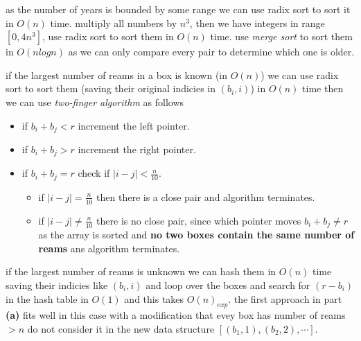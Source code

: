 \documentclass[12pt,twoside]{article}
\begin{document}
\begin{problems}
\begin{problemparts}
\problempart %
  as the number of years is bounded by some range we can use radix sort to sort it in $O(n)$ time.
\problempart %
  multiply all numbers by $n^3$, then we have integers in range $[0,4n^3]$, use radix sort 
  to sort them in $O(n)$ time.
\problempart %
  use \textit{merge sort} to sort them in $O(nlog{n})$ as we can only compare every pair to determine which
  one is older.
\end{problemparts}

\newpage

\problem  %

\begin{problemparts}
\problempart %
  if the largest number of reams in a box is known (in $O(n)$) we can use radix sort to sort them 
  (saving their original indicies in $(b_i, i)$) in $O(n)$ time then we can use \textit{two-finger algorithm} 
  as follows
  \begin{itemize}
      \item if $b_i + b_j < r$ increment the left pointer.
      \item if $b_i + b_j > r$ increment the right pointer.
      \item if $b_i + b_j = r$ check if $|i - j| < \frac{n}{10}$.
        \begin{itemize}
      \item if $|i - j| = \frac{n}{10}$ then there is a close pair and algorithm terminates.
      \item if $|i - j| \neq \frac{n}{10}$ there is no close pair, since which pointer moves 
       $b_i + b_j \neq r$ as the array is sorted and \textbf{no two boxes contain the same number of reams}
       ans algorithm terminates.
        \end{itemize}
  \end{itemize}
  if the largest number of reams is unknown we can hash them in $O(n)$ time saving their indicies like $(b_i, i)$
  and loop over the boxes and search for $(r - b_i)$ in the hash table in $O(1)$ and this takes $O(n)_{exp}$.
  \problempart %
the first approach in part \textbf{(a)} fits well in this case with a modification that evey box has 
  number of reams $> n$ do not consider it in the new data structure $[(b_1, 1), (b_2, 2), \cdots]$.

\end{problemparts}

\newpage

\problem  %


\end{problems}
\end{document}
